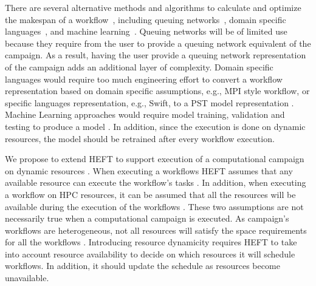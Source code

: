 There are several alternative methods and algorithms to calculate and optimize the makespan of a workflow~\cite{lu2019review}, including queuing networks~\cite{yao2019throughput,bao2019performance}, domain specific languages~\cite{carothers2017durango,maheshwari2016workflow}, and machine learning~\cite{witt2019predictive,pumma2017runtime}.
Queuing networks will be of limited use because they require from the user to provide a queuing network equivalent of the campaign.
As a result, having the user provide a queuing network representation of the campaign adds an additional layer of complexity. 
Domain specific languages would require too much engineering effort to convert a workflow representation based on domain specific assumptions, e.g., MPI style workflow, or specific languages representation, e.g., Swift, to a PST model representation .
Machine Learning approaches would require model training, validation and testing to produce a model .
In addition, since the execution is done on dynamic resources, the model should be retrained after every workflow execution.

We propose to extend HEFT to support execution of a computational campaign on dynamic resources .
When executing a workflows HEFT assumes that any available resource can execute the workflow's tasks .
In addition, when executing a workflow on HPC resources, it can be assumed that all the resources will be available during the execution of the workflows .
These two assumptions are not necessarily true when a computational campaign is executed.
As campaign's workflows are heterogeneous, not all resources will satisfy the space requirements for all the workflows .
Introducing resource dynamicity requires HEFT to take into account resource availability to decide on which resources it will schedule workflows.
In addition, it should update the schedule as resources become unavailable.

